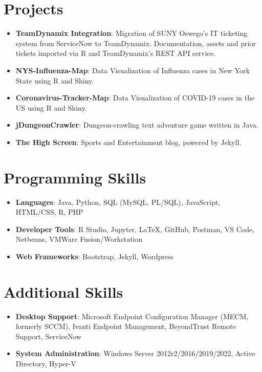 \documentclass[letterpaper,11pt]{article}
\newcommand{\resumeItem}[2]{
  \item\small{
    \textbf{#1}{: #2 \vspace{-2pt}}
  }
}
\newcommand{\resumeSubItem}[2]{\resumeItem{#1}{#2}\vspace{-4pt}}
\newcommand{\resumeSubHeadingListStart}{\begin{itemize}[leftmargin=*]}
\newcommand{\resumeSubHeadingListEnd}{\end{itemize}}
\begin{document}
	
\section{Projects}
  	\resumeSubHeadingListStart
	  	\resumeSubItem{TeamDynamix Integration}{Migration of SUNY Oswego's IT ticketing system from ServiceNow to TeamDynamix. Documentation, assets and prior tickets imported via R and TeamDynamix's REST API service.}
   		\resumeSubItem{NYS-Influenza-Map}{Data Visualization of Influenza cases in New York State using R and Shiny.}
    	\resumeSubItem{Coronavirus-Tracker-Map}{Data Visualization of COVID-19 cases in the US using R and Shiny.}
   		\resumeSubItem{jDungeonCrawler}{Dungeon-crawling text adventure game written in Java.}
    	\resumeSubItem{The High Screen}{Sports and Entertainment blog, powered by Jekyll.}
  	\resumeSubHeadingListEnd

\section{Programming Skills}
  	\resumeSubHeadingListStart
    	\resumeSubItem{Languages}{Java, Python, SQL (MySQL, PL/SQL), JavaScript, HTML/CSS, R, PHP} 
   		\resumeSubItem{Developer Tools}{R Studio, Jupyter, LaTeX, GitHub, Postman, VS Code, Netbeans, VMWare Fusion/Workstation}
    	\resumeSubItem{Web Frameworks}{Bootstrap,  Jekyll, Wordpress} 
  	\resumeSubHeadingListEnd

\section{Additional Skills}
  	\resumeSubHeadingListStart
    	\resumeSubItem{Desktop Support}{Microsoft Endpoint Configuration Manager (MECM, formerly SCCM), Ivanti Endpoint Management, BeyondTrust Remote Support, ServiceNow}
   		\resumeSubItem{System Administration}{Windows Server 2012r2/2016/2019/2022, Active Directory, Hyper-V}
  	\resumeSubHeadingListEnd

\end{document}

